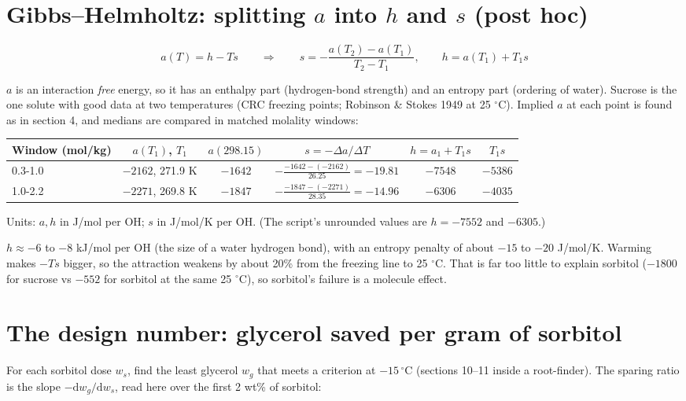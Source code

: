 \documentclass[11pt,a4paper]{article}
\begin{document}
\section{Gibbs--Helmholtz: splitting $a$ into $h$ and $s$ (post hoc)}
\begin{eqbox}
\[ a(T)=h-Ts\qquad\Rightarrow\qquad s=-\frac{a(T_2)-a(T_1)}{T_2-T_1},\qquad h=a(T_1)+T_1s\tag{10}\]
\end{eqbox}
$a$ is an interaction \emph{free} energy, so it has an enthalpy part (hydrogen-bond strength) and an entropy part (ordering of water).
Sucrose is the one solute with good data at two temperatures (CRC freezing points; Robinson \& Stokes 1949 at 25 $^\circ$C).
Implied $a$ at each point is found as in section 4, and medians are compared in matched molality windows:

\begin{center}\small
\begin{tabular}{l c c c c c}
\toprule
Window (mol/kg) & $a(T_1)$, $T_1$ & $a(298.15)$ & $s=-\Delta a/\Delta T$ & $h=a_1+T_1s$ & $T_1 s$\\
\midrule
0.3-1.0 & $-2162$, 271.9 K & $-1642$ & $-\frac{-1642-(-2162)}{26.25}=-19.81$ & $-7548$ & $-5386$\\
1.0-2.2 & $-2271$, 269.8 K & $-1847$ & $-\frac{-1847-(-2271)}{28.35}=-14.96$ & $-6306$ & $-4035$\\
\bottomrule
\end{tabular}
\end{center}
Units: $a,h$ in J/mol per OH; $s$ in J/mol/K per OH. (The script's unrounded values are $h=-7552$ and $-6305$.)
\begin{result}
$h\approx-6$ to $-8$ kJ/mol per OH (the size of a water hydrogen bond), with an entropy penalty of about $-15$ to $-20$
J/mol/K. Warming makes $-Ts$ bigger, so the attraction weakens by about 20\% from the freezing line to 25 $^\circ$C. That
is far too little to explain sorbitol ($-1800$ for sucrose vs $-552$ for sorbitol at the same 25 $^\circ$C), so sorbitol's
failure is a molecule effect.
\end{result}

\section{The design number: glycerol saved per gram of sorbitol}
For each sorbitol dose $w_s$, find the least glycerol $w_g$ that meets a criterion at $-15\,^\circ$C (sections 10--11 inside
a root-finder). The sparing ratio is the slope $-\mathrm{d}w_g/\mathrm{d}w_s$, read here over the first 2 wt\% of sorbitol:
\end{document}
